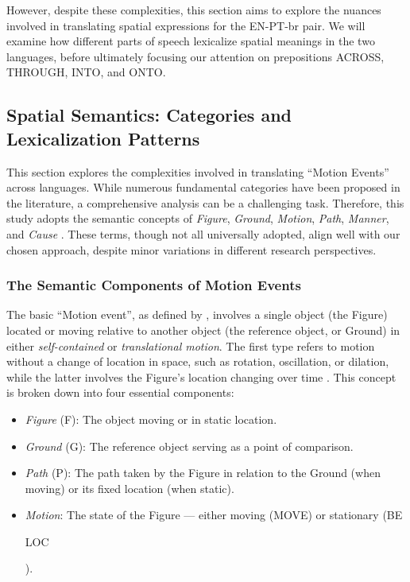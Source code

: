 However, despite these complexities, this section aims to explore the nuances involved in translating spatial expressions for the EN-PT-br pair. We will examine how different parts of speech lexicalize spatial meanings in the two languages, before ultimately focusing our attention on prepositions ACROSS, THROUGH, INTO, and ONTO.


\subsection{Spatial Semantics: Categories and Lexicalization Patterns} 

This section explores the complexities involved in translating ``Motion Events'' across languages. While numerous fundamental categories have been proposed in the literature, a comprehensive analysis can be a challenging task. Therefore, this study adopts the semantic concepts of \emph{Figure}, \emph{Ground}, \emph{Motion}, \emph{Path}, \emph{Manner}, and \emph{Cause} \parencite{talmy1985lexicalization, talmy2000toward, talmy2000towardb}. These terms, though not all universally adopted, align well with our chosen approach, despite minor variations in different research perspectives.


\subsubsection{The Semantic Components of Motion Events} 

The basic ``Motion event'', as defined by \textcite[25-26]{talmy2000towardb}, involves a single object (the Figure) located or moving relative to another object (the reference object, or Ground) in either \emph{self-contained} or \emph{translational motion}. The first type refers to motion without a change of location in space, such as rotation, oscillation, or dilation, while the latter involves the Figure’s location changing over time \parencite{shan2018review}. This concept is broken down into four essential components: 

\begin{itemize}
  \item \emph{Figure} (F): The object moving or in static location.
  \item \emph{Ground} (G): The reference object serving as a point of comparison.
  \item \emph{Path} (P): The path taken by the Figure in relation to the Ground (when moving) or its fixed location (when static).
  \item \emph{Motion}: The state of the Figure --- either moving (MOVE) or stationary (BE\begin{scriptsize}LOC\end{scriptsize}).
\end{itemize}

